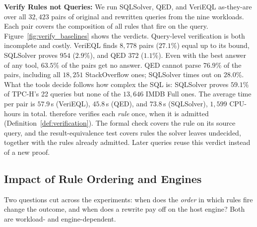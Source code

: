 
\textbf{Verify Rules not Queries:} We run SQLSolver, QED, and VeriEQL as-they-are over all $32{,}423$ pairs of original and rewritten queries from the nine workloads. Each pair covers the composition of all rules that fire on the query. Figure~\ref{fig:verify_baselines} shows the verdicts. Query-level verification is both incomplete and costly. VeriEQL finds $8{,}778$ pairs ($27.1\%$) equal up to its bound, SQLSolver proves $954$ ($2.9\%$), and QED $372$ ($1.1\%$). Even with the best answer of any tool, $63.5\%$ of the pairs get no answer. QED cannot parse $76.9\%$ of the pairs, including all $18{,}251$ \textsf{StackOverflow} ones; SQLSolver times out on $28.0\%$. What the tools decide follows how complex the SQL is: SQLSolver proves $59.1\%$ of \textsf{TPC-H}'s 22 queries but none of the $13{,}646$ \textsf{IMDB Full} ones. The average time per pair is $57.9$\,s (VeriEQL), $45.8$\,s (QED), and $73.8$\,s (SQLSolver), $1{,}599$ CPU-hours in total.
{\sys} therefore verifies each \emph{rule} once, when it is admitted (Definition~\ref{def:verification}).  The formal check covers the rule on its source query, and the result-equivalence test covers rules the solver leaves undecided, together with the rules already admitted. Later queries reuse this verdict instead of a new proof.


\subsection{Impact of Rule Ordering and Engines}
\label{sec:exp:discussion}
Two questions cut across the experiments: when does the \emph{order} in which rules fire change the outcome, and when does a rewrite pay off on the host engine? Both are workload- and engine-dependent.

